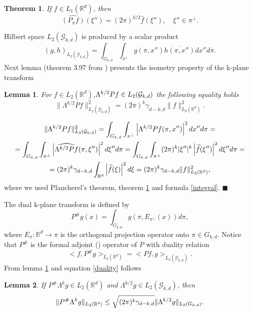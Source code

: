 \documentclass[12pt]{iopart}
\newtheorem{theorem}{Theorem}
\newtheorem{lemma}{Lemma}
\newenvironment{proof}
{\par\noindent{\bf Proof}}
{\hfill$\scriptstyle\blacksquare$}
\begin{document}
	\begin{theorem}
		\label{projection}
		If $f\in L_1(\mathbb R^d)$, then
		$$\widehat{(P_\pi f)}(\xi'')=(2\pi)^{k/2}\widehat f(\xi''),\quad \xi''\in\pi^\perp.$$
	\end{theorem}
Hilbert space $L_2(\mathcal G_{k,d})$ is produced by a scalar product	
	$$(g,h)_{L_2(\mathcal G_{k,d})}=\int_{G_{k,d}}\int_{\pi^\perp}g(\pi,x'')\overline{h(\pi,x'')}dx''d\pi.$$
Next lemma (theorem 3.97 from \cite{MA}) presents the isometry property of the k-plane transform
	\begin{lemma}
		\label{isometry}
			For $f\in L_2(\mathbb R^d)$,$\Lambda^{k/2}Pf\in L_2(\mathbb \mathfrak \mathcal G_{k,d})$ the following equality holds
			$$\|\Lambda^{k/2}Pf\|^2_{L_2(\mathcal G_{k,d})}=(2\pi)^k\gamma_{d-k,d}\|f\|^2_{L_2(\mathbb R^d)}.$$
	\end{lemma}
	\begin{proof}
	\begin{multline*}
	\|\Lambda^{k/2}Pf\|^2_{L_2(\mathcal G_{k,d})}=\int_{G_{k,d}}\int_{\pi^\perp}\left|\Lambda^{k/2}Pf(\pi,x'')\right|^2dx''d\pi=\\
	=\int_{G_{k,d}}\int_{\pi^\perp}\left|\widehat{\Lambda^{k/2}Pf}(\pi,\xi'')\right|^2d\xi''d\pi=\int_{G_{k,d}}\int_{\pi^\perp}(2\pi)^k|\xi''|^k\left|\widehat{f}(\xi'')\right|^2d\xi''d\pi=\\
	=(2\pi)^k\gamma_{d-k,d}\int_{\mathbb R^d}\left|\widehat{f}(\xi)\right|^2d\xi =(2\pi)^k\gamma_{d-k,d}\|f\|^2_{L_2(\mathbb R^d)},$$
	\end{multline*}
	where we used Plancherel's theorem, theorem \ref{projection} and formula \eqref{integral}.
	\end{proof}	
	
The dual k-plane transform is defined by
	$$P^\#g(x) = \int_{G_{k,d}}g(\pi,E_{\pi^\perp}(x))d\pi,$$
where $E_\pi:\mathbb R^d\rightarrow\pi$ is the orthogonal projection operator onto $\pi\in G_{k,d}$.
Notice that $P^\#$ is the formal adjoint (\cite{MA}) operator of $P$ with duality relation
	\begin{equation}
	\label{duality}
	<f,P^\#g>_{L_2(\mathbb R^d)} = <Pf,g>_{L_2(\mathcal G_{k,d})}.
	\end{equation}
From lemma \ref{isometry} and equation \eqref{duality} follows

	\begin{lemma}
	\label{lemma2}
	If $P^\#\Lambda^kg\in L_2(\mathbb R^d)$ and $\Lambda^{k/2}g\in L_2(\mathcal G_{k,d})$, then
	$$\|P^\#\Lambda^kg\|_{L_2(\mathbb R^d)}\le\sqrt{(2\pi)^k\gamma_{d-k,d}}\|\Lambda^{k/2}g\|_{L_2(\mathbb \mathcal G_{k,d})}.$$
	\end{lemma}
	
\end{document}
